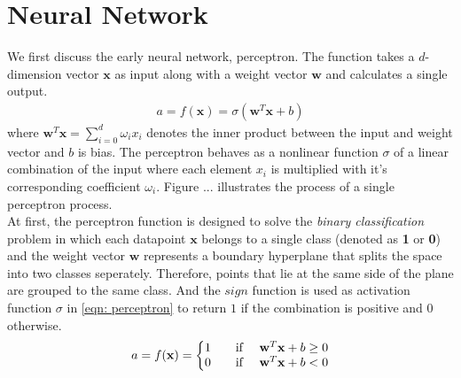\section{Neural Network}
\label{model:mlp}
We first discuss the early neural network, perceptron. The function takes a $d$-dimension vector $\mathbf{x}$ as input along with a weight vector $\mathbf{w}$ and calculates a single output. 
\begin{align} \label{eqn: perceptron}
    a = f(\mathbf{x}) = \sigma(\mathbf{w}^T\mathbf{x} + b)
\end{align}
where $\mathbf{w}^T\mathbf{x} = \sum_{i=0}^{d} \omega_{i}x_{i} $ denotes the inner product between the input and weight vector and $b$ is bias. The perceptron behaves as a nonlinear function $\sigma$ of a linear combination of the input where each element $x_{i}$ is multiplied with it's corresponding coefficient $\omega_{i}$. 
Figure ... illustrates the process of a single perceptron process.\\
At first, the perceptron function is designed to solve the \textit{binary classification} problem in which each datapoint $\mathbf{x}$ belongs to a single class (denoted as \textbf{1} or \textbf{0}) and the weight vector $\mathbf{w}$ represents a boundary hyperplane that splits the space into two classes seperately. 
Therefore, points that lie at the same side of the plane are grouped to the same class. 
And the $sign$ function is used as activation function $\sigma$ in \ref{eqn: perceptron} to return $1$ if the combination is positive and $0$ otherwise.
\begin{align} \label{eqn: sgn_perceptron}
    a = f(\mathbf{x}) = \left\{\begin{matrix}
1 & \text{\quad if \quad} \mathbf{w}^T\mathbf{x} + b\geq 0 \\ 
0 & \text{\quad if \quad} \mathbf{w}^T\mathbf{x} + b <  0 
\end{matrix}\right.
\end{align}

